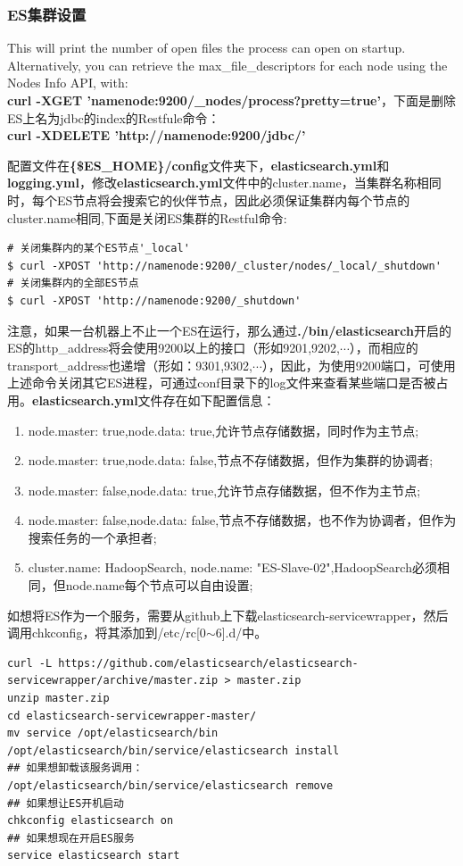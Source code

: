\subsubsection{ES集群设置}
\par This will print the number of open files the process can open on startup. Alternatively, you can retrieve the max\_file\_descriptors for each node using the Nodes Info API, with:\\
\textbf{curl -XGET 'namenode:9200/\_nodes/process?pretty=true'}，下面是删除ES上名为jdbc的index的Restfule命令：\\
\textbf{curl -XDELETE 'http://namenode:9200/jdbc/'}
\par 配置文件在\textbf{\{\$ES\_HOME\}/config}文件夹下，\textbf{elasticsearch.yml}和\textbf{logging.yml}，修改\textbf{elasticsearch.yml}文件中的cluster.name，当集群名称相同时，每个ES节点将会搜索它的伙伴节点，因此必须保证集群内每个节点的cluster.name相同,下面是关闭ES集群的Restful命令:
\begin{verbatim}
# 关闭集群内的某个ES节点'_local'
$ curl -XPOST 'http://namenode:9200/_cluster/nodes/_local/_shutdown'
# 关闭集群内的全部ES节点
$ curl -XPOST 'http://namenode:9200/_shutdown'
\end{verbatim}
\par 注意，如果一台机器上不止一个ES在运行，那么通过\textbf{./bin/elasticsearch}开启的ES的http\_address将会使用9200以上的接口（形如9201,9202,$\cdots$），而相应的transport\_address也递增（形如：9301,9302,$\cdots$），因此，为使用9200端口，可使用上述命令关闭其它ES进程，可通过conf目录下的log文件来查看某些端口是否被占用。\textbf{elasticsearch.yml}文件存在如下配置信息：
\begin{enumerate}[(1)]
\item node.master: true,node.data: true,允许节点存储数据，同时作为主节点;
\item node.master: true,node.data: false,节点不存储数据，但作为集群的协调者;
\item node.master: false,node.data: true,允许节点存储数据，但不作为主节点;
\item node.master: false,node.data: false,节点不存储数据，也不作为协调者，但作为搜索任务的一个承担者;
\item cluster.name: HadoopSearch, node.name: "ES-Slave-02",HadoopSearch必须相同，但node.name每个节点可以自由设置;
\end{enumerate}
如想将ES作为一个服务，需要从github上下载elasticsearch-servicewrapper，然后调用chkconfig，将其添加到/etc/rc[0$\sim$6].d/中。
\begin{verbatim}
curl -L https://github.com/elasticsearch/elasticsearch-servicewrapper/archive/master.zip > master.zip
unzip master.zip
cd elasticsearch-servicewrapper-master/
mv service /opt/elasticsearch/bin
/opt/elasticsearch/bin/service/elasticsearch install
## 如果想卸载该服务调用：
/opt/elasticsearch/bin/service/elasticsearch remove
## 如果想让ES开机启动
chkconfig elasticsearch on  
## 如果想现在开启ES服务
service elasticsearch start 
\end{verbatim}
